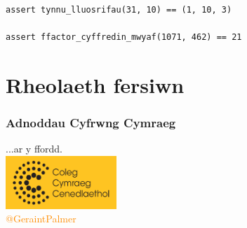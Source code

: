 \documentclass{beamer}
\begin{document}
\begin{frame}[fragile]
\begin{verbatim}
assert tynnu_lluosrifau(31, 10) == (1, 10, 3)

assert ffactor_cyffredin_mwyaf(1071, 462) == 21
\end{verbatim}
\end{frame}

\begin{frame}
  \begin{center}
    \vspace{0.8cm}
    
  \end{center}
\end{frame}

\section[]{Rheolaeth fersiwn}
\begin{frame}
\frametitle{\hfill}
\end{frame}

\begin{frame}

\end{frame}

\begin{frame}
\frametitle{Adnoddau Cyfrwng Cymraeg}
\begin{center}
\huge{...ar y ffordd.}\\
\vspace{1cm}
\includegraphics[height=2cm]{ccclogo}\\
\vspace{1cm}
\small{\textcolor{darkorange}{@GeraintPalmer}}
\end{center}
\end{frame}
\end{document}
